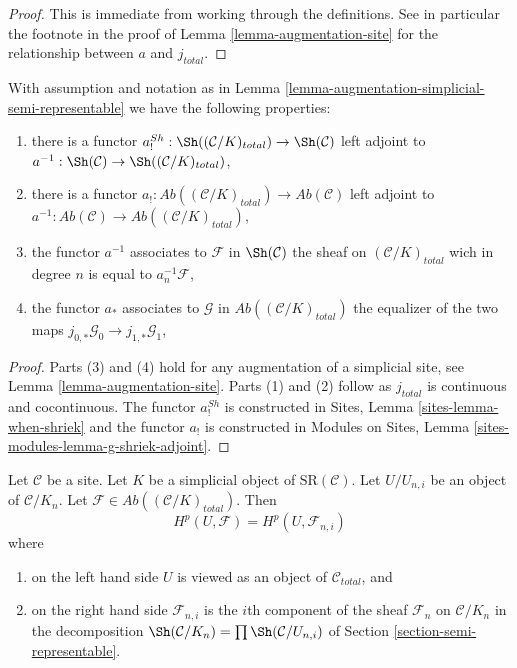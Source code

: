 \begin{proof}
This is immediate from working through the definitions.
See in particular the footnote in the proof of
Lemma \ref{lemma-augmentation-site}
for the relationship between $a$ and $j_{total}$.
\end{proof}

\begin{lemma}
\label{lemma-comparison}
With assumption and notation as in
Lemma \ref{lemma-augmentation-simplicial-semi-representable}
we have the following properties:
\begin{enumerate}
\item there is a functor
$a^{Sh}_! : \Sh((\mathcal{C}/K)_{total}) \to \Sh(\mathcal{C})$
left adjoint to $a^{-1} : \Sh(\mathcal{C}) \to \Sh((\mathcal{C}/K)_{total})$,
\item there is a functor
$a_! : \textit{Ab}((\mathcal{C}/K)_{total}) \to \textit{Ab}(\mathcal{C})$
left adjoint to
$a^{-1} : \textit{Ab}(\mathcal{C}) \to \textit{Ab}((\mathcal{C}/K)_{total})$,
\item the functor $a^{-1}$ associates to
$\mathcal{F}$ in $\Sh(\mathcal{C})$ the sheaf on $(\mathcal{C}/K)_{total}$
wich in degree $n$ is equal to $a_n^{-1}\mathcal{F}$,
\item the functor $a_*$ associates to $\mathcal{G}$ in
$\textit{Ab}((\mathcal{C}/K)_{total})$ the equalizer of the two maps
$j_{0, *}\mathcal{G}_0 \to j_{1, *}\mathcal{G}_1$,
\end{enumerate}
\end{lemma}

\begin{proof}
Parts (3) and (4) hold for any augmentation of a
simplicial site, see Lemma \ref{lemma-augmentation-site}.
Parts (1) and (2) follow as $j_{total}$ is continuous and cocontinuous.
The functor $a^{Sh}_!$ is constructed in
Sites, Lemma \ref{sites-lemma-when-shriek}
and the functor $a_!$ is constructed in
Modules on Sites, Lemma
\ref{sites-modules-lemma-g-shriek-adjoint}.
\end{proof}

\begin{lemma}
\label{lemma-sanity-check-simplicial-semi-representable}
Let $\mathcal{C}$ be a site. Let $K$ be a simplicial object of
$\text{SR}(\mathcal{C})$. Let $U/U_{n, i}$ be an object of
$\mathcal{C}/K_n$. Let
$\mathcal{F} \in \textit{Ab}((\mathcal{C}/K)_{total})$.
Then
$$
H^p(U, \mathcal{F}) = H^p(U, \mathcal{F}_{n, i})
$$
where
\begin{enumerate}
\item on the left hand side $U$ is viewed as an object of
$\mathcal{C}_{total}$, and
\item on the right hand side $\mathcal{F}_{n, i}$ is the $i$th
component of the sheaf $\mathcal{F}_n$ on $\mathcal{C}/K_n$
in the decomposition $\Sh(\mathcal{C}/K_n) = \prod \Sh(\mathcal{C}/U_{n, i})$
of Section \ref{section-semi-representable}.
\end{enumerate}
\end{lemma}

